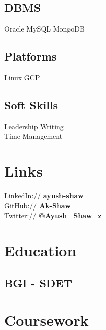 \documentclass[]{deedy-resume-openfont}
\begin{document}
\begin{minipage}[t]{0.33\textwidth}
\subsection{DBMS}
Oracle \textbullet{} MySQL \textbullet{} MongoDB
\sectionsep

\subsection{Platforms}
Linux \textbullet{} GCP 
\sectionsep

\subsection{Soft Skills}
Leadership \textbullet{} Writing \\ 
\textbullet{} Time Management
\sectionsep


\section{Links} 
LinkedIn://  \href{https://www.linkedin.com/in/ayush-shaw}{\bf ayush-shaw} \\
GitHub://  \href{https://github.com/Ak-Shaw}{\bf Ak-Shaw} \\
Twitter://  \href{https://twitter.com/Ayush_Shaw_z}{\bf @Ayush\_Shaw\_z} \\
\sectionsep


\section{Education} 

\subsection{BGI - SDET}
\sectionsep


\section{Coursework}


\end{minipage}
\end{document}
